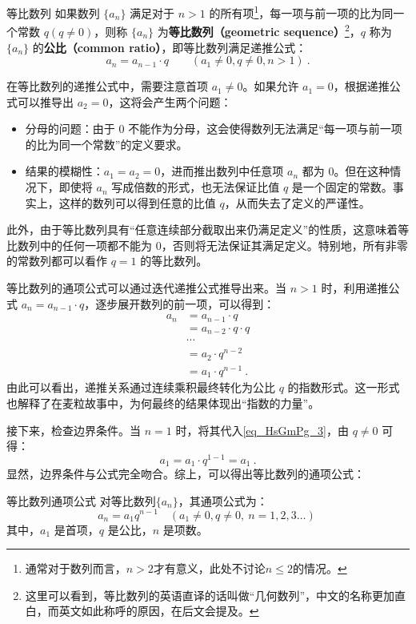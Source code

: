 \begin{definition}{等比数列}\label{def_HsGmPg_1}
如果数列 $\{a_n\}$ 满足对于 $n > 1$ 的所有项\footnote{通常对于数列而言，$n>2$才有意义，此处不讨论$n\leq2$的情况。}，每一项与前一项的比为同一个常数 $q(q\neq0)$，则称 $\{a_n\}$ 为\textbf{等比数列（geometric sequence）}\footnote{这里可以看到，等比数列的英语直译的话叫做“几何数列”，中文的名称更加直白，而英文如此称呼的原因，在后文会提及。}，$q$ 称为 $\{a_n\}$ 的\textbf{公比（common ratio）}，即等比数列满足递推公式：
\begin{equation}
a_{n}=a_{n-1}\cdot q\qquad( a_1\neq0,q\neq0,n>1)~.
\end{equation}
\end{definition}
在等比数列的递推公式中，需要注意首项 $a_1 \neq 0$。如果允许 $a_1 = 0$，根据递推公式可以推导出 $a_2 = 0$，这将会产生两个问题：
\begin{itemize}
\item 分母的问题：由于 $0$ 不能作为分母，这会使得数列无法满足“每一项与前一项的比为同一个常数”的定义要求。
\item 结果的模糊性：$a_1=a_2=0$，进而推出数列中任意项 $a_n$ 都为 $0$。但在这种情况下，即使将 $a_n$ 写成倍数的形式，也无法保证比值 $q$ 是一个固定的常数。事实上，这样的数列可以得到任意的比值 $q$，从而失去了定义的严谨性。
\end{itemize}
此外，由于等比数列具有“任意连续部分截取出来仍满足定义”的性质，这意味着等比数列中的任何一项都不能为 $0$，否则将无法保证其满足定义。特别地，所有非零的常数列都可以看作 $q = 1$ 的等比数列。

等比数列的通项公式可以通过迭代递推公式推导出来。当 $n > 1$ 时，利用递推公式 $a_n = a_{n-1} \cdot q$，逐步展开数列的前一项，可以得到：
\begin{equation}\label{eq_HsGmPg_3}
\begin{aligned}
a_n &= a_{n-1} \cdot q\\
&= a_{n-2}\cdot q\cdot q\\
&\cdots \\
&= a_2\cdot q^{n-2}\\
&=  a_1 \cdot q^{n-1}~.
\end{aligned}
\end{equation}
由此可以看出，递推关系通过连续乘积最终转化为公比 $q$ 的指数形式。这一形式也解释了在麦粒故事中，为何最终的结果体现出“指数的力量”。

接下来，检查边界条件。当 $n = 1$ 时，将其代入\autoref{eq_HsGmPg_3}，由 $q \neq 0$ 可得：
\begin{equation}
a_1=a_1\cdot q^{1-1}=a_1~.
\end{equation}
显然，边界条件与公式完全吻合。综上，可以得出等比数列的通项公式：
\begin{corollary}{等比数列通项公式}
对等比数列$\{a_n\}$，其通项公式为：
\begin{equation}
a_n = a_1 q^{n-1} \quad (a_1\neq0, q\ne 0,\ n=1,2,3\dots)~
\end{equation}
其中，$a_1$ 是首项，$q$ 是公比，$n$ 是项数。
\end{corollary}

